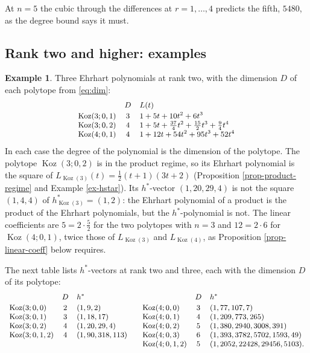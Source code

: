 \documentclass[11pt, a4paper, abstract=yes]{scrartcl}
\theoremstyle{definition}
\newtheorem{mexample}[definition]{Example}
\theoremstyle{remark}
\theoremstyle{plain}
\theoremstyle{remark}
\theoremstyle{plain}
\newcommand{\Koz}{\operatorname{Koz}}
\begin{document}
At \(n=5\) the cubic through the differences at \(r=1,\dots,4\) predicts the fifth, \(5480\), as the
degree bound says it must.
\subsection{Rank two and higher: examples}
\label{sec:orgac5c9e7}

\begin{mexample}
Three Ehrhart polynomials at rank two, with the dimension \(D\) of each polytope from \eqref{eq:dim}:
\[\small
\begin{array}{lcl}
 & D & L(t)\\[2pt]
\Koz(3;0,1) & 3 & 1+5t+10t^2+6t^3\\
\Koz(3;0,2) & 4 & 1+5t+\tfrac{37}4t^2+\tfrac{15}2t^3+\tfrac94t^4\\
\Koz(4;0,1) & 4 & 1+12t+54t^2+95t^3+52t^4
\end{array}
\]
In each case the degree of the polynomial is the dimension of the polytope. The polytope
\(\Koz(3;0,2)\) is in the product regime, so its Ehrhart polynomial is the square of
\(L_{\Koz(3)}(t)=\tfrac12(t+1)(3t+2)\) (Proposition \ref{prop-product-regime} and Example \ref{ex-hstar}). Its
\(h^*\)-vector \((1,20,29,4)\) is not the square \((1,4,4)\) of \(h^*_{\Koz(3)}=(1,2)\): the Ehrhart
polynomial of a product is the product of the Ehrhart polynomials, but the \(h^*\)-polynomial is not.
The linear coefficients are \(5=2\cdot\tfrac52\) for the two polytopes with \(n=3\) and \(12=2\cdot6\)
for \(\Koz(4;0,1)\), twice those of \(L_{\Koz(3)}\) and \(L_{\Koz(4)}\), as Proposition \ref{prop-linear-coeff}
below requires.

The next table lists \(h^*\)-vectors at rank two and three, each with the dimension \(D\) of its
polytope:
\[\small
\begin{array}{lcl@{\qquad}lcl}
 & D & h^* & & D & h^*\\[2pt]
\Koz(3;0,0) & 2 & (1,9,2) & \Koz(4;0,0) & 3 & (1,77,107,7)\\
\Koz(3;0,1) & 3 & (1,18,17) & \Koz(4;0,1) & 4 & (1,209,773,265)\\
\Koz(3;0,2) & 4 & (1,20,29,4) & \Koz(4;0,2) & 5 & (1,380,2940,3008,391)\\
\Koz(3;0,1,2) & 4 & (1,90,318,113) & \Koz(4;0,3) & 6 & (1,393,3782,5702,1593,49)\\
 & & & \Koz(4;0,1,2) & 5 & (1,2052,22428,29456,5103).
\end{array}
\]
\label{ex-ehrhart-rank2}
\end{mexample}
\end{document}
